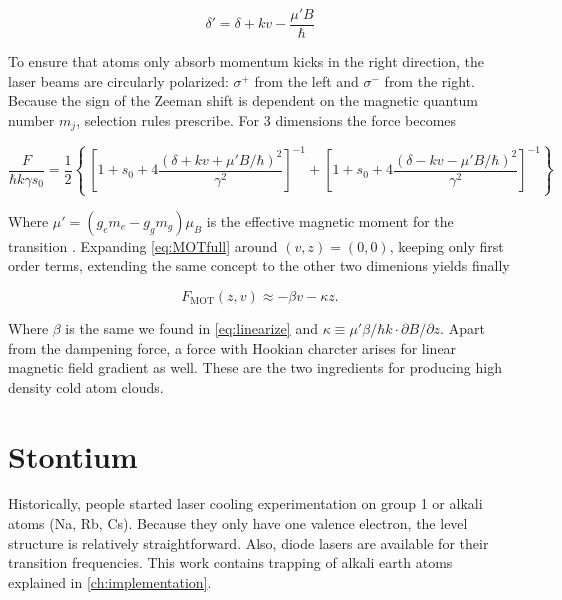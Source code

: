 \begin{equation}\label{eq:DetuningFull}
	\delta' = \delta + k v - \frac{\mu'B}{\hbar}
\end{equation}

To ensure that atoms only absorb momentum kicks in the right direction, the laser beams are circularly polarized: $\sigma^+$ from the left and $\sigma^-$ from the right. Because the sign of the Zeeman shift is dependent on the magnetic quantum number $m_j$, selection rules prescribe. For 3 dimensions the force becomes

\begin{equation}\label{eq:MOTfull}
	\frac{F}{\hbar k \gamma s_0} = \frac{1}{2}\left\{\
	\left[1 + s_0 + 4\frac{(\delta+kv+\mu'B/\hbar)^2}{\gamma^2}\right]^{-1}+
	\left[1 + s_0 + 4\frac{(\delta-kv-\mu'B/\hbar)^2}{\gamma^2}\right]^{-1}
	\right\}
\end{equation}

Where $\mu' = (g_e m_e-g_g m_g)\mu_B$ is the effective magnetic moment for the transition \cite{Kowalski2010}. Expanding \cref{eq:MOTfull} around $(v,z) = (0,0)$, keeping only first order terms, extending the same concept to the other two dimenions yields finally

\begin{equation}\label{eq:ForceMOT}
	F_{\text{MOT}}(z,v) \approx -\beta v - \kappa z.
\end{equation}

Where $\beta$ is the same we found in \cref{eq:linearize} and $\kappa \equiv \mu' \beta /\hbar k \cdot \partial B/\partial z$. Apart from the dampening force, a force with Hookian charcter arises for linear magnetic field gradient as well. These are the two ingredients for producing high density cold atom clouds. 



\section{Stontium}\label{sec:Sr}

Historically, people started laser cooling experimentation on group 1 or alkali atoms (Na, Rb, Cs). Because they only have one valence electron, the level structure is relatively straightforward. Also, diode lasers are available for their transition frequencies. This work contains trapping of alkali earth atoms explained in \cref{ch:implementation}.

